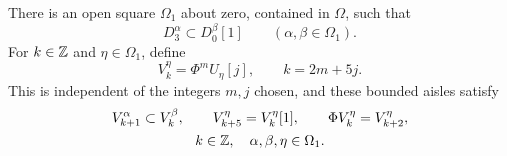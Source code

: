 \begin{proposition}\label{prop:fine-grid}
There is an open square $\Omega_1$ about zero, contained in $\Omega$, such
that
\begin{equation}\label{eq:single-shift-inclusion}
 D_3^\alpha\subset D_0^\beta[1]
 \qquad(\alpha,\beta\in\Omega_1).
\end{equation}
For $k\in\mathbb Z$ and $\eta\in\Omega_1$, define
\begin{equation}\label{eq:fifths-aisles}
 V_k^\eta=\Phi^mU_\eta[j],\qquad k=2m+5j.
\end{equation}
This is independent of the integers $m,j$ chosen, and these bounded aisles
satisfy
\begin{equation}\label{eq:fifths-nesting}
 \begin{gathered}
 V_{k+1}^\alpha\subset V_k^\beta,\qquad
 V_{k+5}^\eta=V_k^\eta[1],\qquad
 \Phi V_k^\eta=V_{k+2}^\eta,\\
 k\in\mathbb Z,\quad \alpha,\beta,\eta\in\Omega_1.
 \end{gathered}
\end{equation}
\end{proposition}

